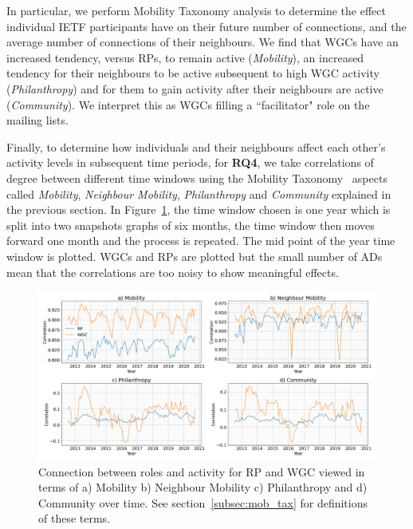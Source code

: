 \documentclass[twocolumn,10pt]{article}
\newlength{\figureWidthTwoColumn}
\begin{document}
In particular, we perform Mobility Taxonomy analysis to determine the
effect individual IETF participants have on their future number of
connections, and the average number of connections of their neighbours.  We
find that WGCs have an increased tendency, versus RPs, to remain active
(\textit{Mobility}), an increased tendency for their neighbours to be
active subsequent to high WGC activity (\textit{Philanthropy}) and for them
to gain activity after their neighbours are active (\textit{Community}).
We interpret this as WGCs filling a ``facilitator" role on the mailing
lists.



Finally, to determine how individuals and their neighbours affect each
other's activity levels in subsequent time periods, for \textbf{RQ4}, we
take correlations of degree between different time windows using the
Mobility Taxonomy~\cite{barnes2023measuring} aspects called
\textit{Mobility}, \textit{Neighbour Mobility}, \textit{Philanthropy} and
\textit{Community} explained in the previous section. In
Figure~\ref{fig:mob_tax}, the time window chosen is one year which is split
into two snapshots graphs of six months, the time window then moves forward
one month and the process is repeated. The mid point of the year time
window is plotted. WGCs and RPs are plotted but the small number of ADs
mean that the correlations are too noisy to show meaningful effects. 

\begin{figure}[t]
  \centering
  \includegraphics[width=\figureWidthTwoColumn]{figures-prev/icwsm-2024/hierarchy_status_comparison.png}
  \caption{
    Connection between roles and activity for RP and WGC viewed in terms of
    a) Mobility b) Neighbour Mobility c) Philanthropy and d) Community over
    time. See section~\ref{subsec:mob_tax} for definitions of these terms.
  }
  \label{fig:mob_tax}
\end{figure}
\end{document}
